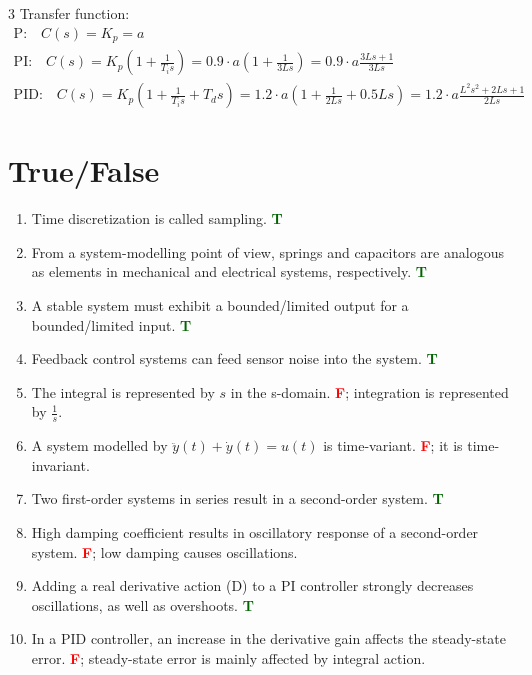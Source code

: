 \documentclass[9pt, landscape, a4paper]{article}
\begin{document}
\begin{multicols*}{3}
Transfer function:
\begin{gather*}
\text{P:}\quad C(s) = K_p = a \\[6pt]
\text{PI:}\quad C(s) = K_p\left(1+\frac{1}{T_i s}\right)
= 0.9\cdot a\left(1+\frac{1}{3Ls}\right)
= 0.9\cdot a \frac{3Ls+1}{3Ls} \\[6pt]
\text{PID:}\quad C(s) = K_p\left(1+\frac{1}{T_i s}+T_d s\right)
= 1.2\cdot a\left(1+\frac{1}{2Ls}+0.5Ls\right)
= 1.2\cdot a \frac{L^2s^2+2Ls+1}{2Ls}
\end{gather*}

\newpage
\section{True/False}
\scriptsize
\begin{enumerate}[leftmargin=*, itemsep=2pt, parsep=1pt]
    \item Time discretization is called sampling. \textbf{\textcolor{darkgreen}{T}}
    \item From a system-modelling point of view, springs and capacitors are analogous as elements in mechanical and electrical systems, respectively. \textbf{\textcolor{darkgreen}{T}}
    \item A stable system must exhibit a bounded/limited output for a bounded/limited input. \textbf{\textcolor{darkgreen}{T}}
    \item Feedback control systems can feed sensor noise into the system. \textbf{\textcolor{darkgreen}{T}}
    \item The integral is represented by $s$ in the s-domain. \textbf{\textcolor{red}{F}}; integration is represented by $\frac{1}{s}$.
    \item A system modelled by $\ddot{y}(t)+\dot{y}(t)=u(t)$ is time-variant. \textbf{\textcolor{red}{F}}; it is time-invariant.
    \item Two first-order systems in series result in a second-order system. \textbf{\textcolor{darkgreen}{T}}
    \item High damping coefficient results in oscillatory response of a second-order system. \textbf{\textcolor{red}{F}}; low damping causes oscillations.
    \item Adding a real derivative action (D) to a PI controller strongly decreases oscillations, as well as overshoots. \textbf{\textcolor{darkgreen}{T}}
    \item In a PID controller, an increase in the derivative gain affects the steady-state error. \textbf{\textcolor{red}{F}}; steady-state error is mainly affected by integral action.

\end{enumerate}
\end{multicols*}
\end{document}
